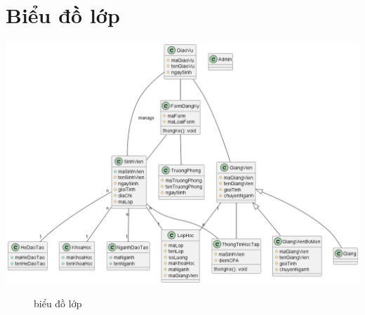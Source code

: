 \section{Biểu đồ lớp}
\begin{center}
	\includegraphics[width=1.2\textwidth]{image/class.png}
	\begin{figure}[h]
		\centering
		\caption{biểu đồ lớp}
	\end{figure}
\end{center}



% 
% 


